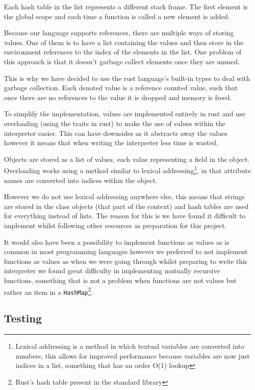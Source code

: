 \documentclass{article}
\begin{document}
Each hash table in the list represents a different stack frame. The first
element is the global scope and each time a function is called a new element is
added.

Because our language supports references, there are multiple ways of storing
values. One of them is to have a list containing the values and then store in
the environment references to the index of the elements in the list. One
problem of this approach is that it doesn't garbage collect elements once they
are unused.

This is why we have decided to use the rust language's built-in types to deal
with garbage collection. Each denoted value is a reference counted value, such
that once there are no references to the value it is dropped and memory is
freed.

To simplify the implementation, values are implemented entirely in rust and use
overloading (using the traits in rust) to make the use of values within the
interpreter easier. This can have downsides as it abstracts away the values
however it means that when writing the interpreter less time is wasted.

Objects are stored as a list of values, each value representing a field in the
object. Overloading works using a method similar to lexical
addressing\footnote{Lexical addressing is a method in which textual variables
are converted into numbers, this allows for improved performance because
variables are now just indices in a list, something that has an order O(1)
lookup}, in that attribute names are converted into indices within the object.

However we do not use lexical addressing anywhere else, this means that strings
are stored in the class objects (that part of the context) and hash tables are
used for everything instead of lists. The reason for this is we have found it
difficult to implement whilst following other resources as preparation for this
project.

It would also have been a possibility to implement functions as values as is
common in most programming languages however we preferred to not implement
functions as values as when we were going through  whilst
preparing to write this interpreter we found great difficulty in implementing
mutually recursive functions, something that is not a problem when functions
are not values but rather an item in a \texttt{HashMap}\footnote{Rust's hash
table present in the standard library}.

\subsection{Testing}
\end{document}
